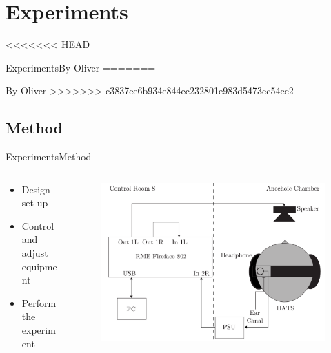 \section{Experiments}
<<<<<<< HEAD
\begin{frame}{Experiments}{By Oliver}
=======
\begin{frame}{By Oliver}
>>>>>>> c3837ee6b934e844ec232801e983d5473ec54ec2
\end{frame}

\subsection{Method}
\begin{frame}{Experiments}{Method}		
	\begin{columns}
		\begin{column}{0.5\textwidth}
			\begin{itemize}
				\item Design set-up
				\item Control and adjust equipment
				\item Perform the experiment
			\end{itemize}	
		\end{column}
		\begin{column}{0.5\textwidth} 
			\begin{figure}
				\includegraphics[width=1\textwidth]{figures/SetupDiagram.pdf}
			\end{figure}
		\end{column}
	\end{columns}
\end{frame}


\end{frame}
